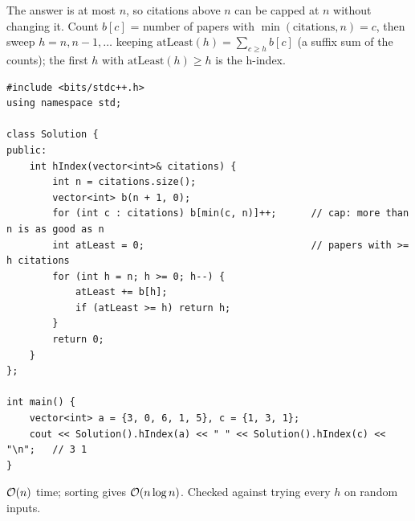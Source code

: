\begin{solutionbox}[E5.5 H-Index]
The answer is at most $n$, so citations above $n$ can be capped at $n$ without changing it. Count $b[c]$ = number of papers with $\min(\text{citations}, n) = c$, then sweep $h = n, n-1, \dots$ keeping $\text{atLeast}(h) = \sum_{c \ge h} b[c]$ (a suffix sum of the counts); the first $h$ with $\text{atLeast}(h) \ge h$ is the h-index.
\begin{lstlisting}[style=cpp]
#include <bits/stdc++.h>
using namespace std;

class Solution {
public:
    int hIndex(vector<int>& citations) {
        int n = citations.size();
        vector<int> b(n + 1, 0);
        for (int c : citations) b[min(c, n)]++;      // cap: more than n is as good as n
        int atLeast = 0;                             // papers with >= h citations
        for (int h = n; h >= 0; h--) {
            atLeast += b[h];
            if (atLeast >= h) return h;
        }
        return 0;
    }
};

int main() {
    vector<int> a = {3, 0, 6, 1, 5}, c = {1, 3, 1};
    cout << Solution().hIndex(a) << " " << Solution().hIndex(c) << "\n";   // 3 1
}
\end{lstlisting}
\begin{center}
\end{center}
$\mathcal{O}(n)$ time; sorting gives $\mathcal{O}(n \log n)$. Checked against trying every $h$ on random inputs.
\end{solutionbox}

